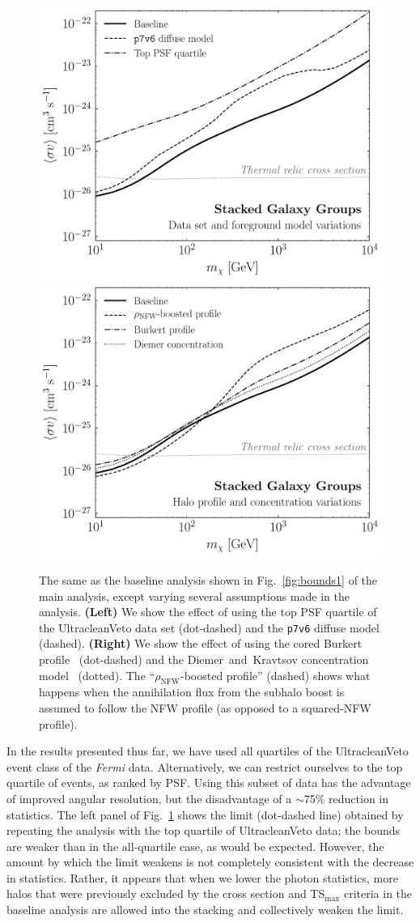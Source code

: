 \begin{figure}[t]
  \centering
  \includegraphics[width=.45\textwidth]{ch-clusters/plots/systematics_dataset.pdf}
  \includegraphics[width=.45\textwidth]{ch-clusters/plots/systematics_profile_conc.pdf}
  \caption{The same as the baseline analysis shown in Fig.~\ref{fig:bounds1} of the main analysis, except varying several assumptions made in the analysis.  \textbf{(Left)} We show the effect of using the top PSF quartile of the UltracleanVeto data set (dot-dashed) and the \texttt{p7v6} diffuse model (dashed). \textbf{(Right)} We show the effect of using the cored Burkert profile~\cite{Burkert:1995yz} (dot-dashed) and the Diemer~and~Kravtsov concentration model~\cite{Diemer:2014gba} (dotted).  The ``$\rho_\text{NFW}$-boosted profile'' (dashed) shows what happens when the annihilation flux from the subhalo boost is assumed to follow the NFW profile (as opposed to a squared-NFW profile). }
  \label{fig:systematics_data_profile}
\end{figure}

In the results presented thus far, we have used all quartiles of the UltracleanVeto event class of the {\it Fermi} data.  Alternatively, we can restrict ourselves to the top quartile of events, as ranked by PSF.  Using this subset of data has the advantage of improved angular resolution, but the disadvantage of a $\sim$75\% reduction in statistics.  The  left panel of Fig.~\ref{fig:systematics_data_profile} shows the limit (dot-dashed line) obtained by repeating the analysis with the top quartile of UltracleanVeto data; the bounds are weaker than in the all-quartile case, as would be expected.  However, the amount by which the limit weakens is not completely consistent with the decrease in statistics.  Rather, it appears that when we lower the photon statistics, more halos that were previously excluded by the cross section and TS$_\text{max}$ criteria in the baseline analysis are allowed into the stacking and collectively weaken the limit.

